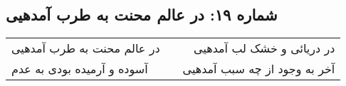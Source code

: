 \begin{center}
\section*{شماره ۱۹: در عالم محنت به طرب آمدهیی}
\label{sec:019}
\begin{longtable}{l p{0.5cm} r}
در عالم محنت به طرب آمدهیی
&&
در دریائی و خشک لب آمدهیی
\\
آسوده و آرمیده بودی به عدم
&&
آخر به وجود از چه سبب آمدهیی
\\
\end{longtable}
\end{center}

